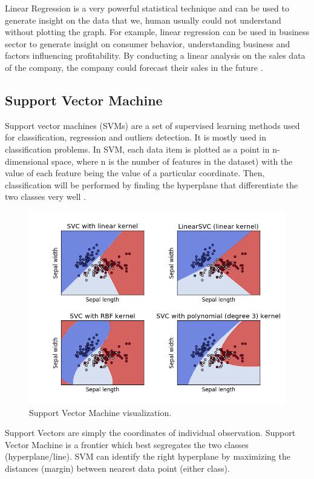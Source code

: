 \documentclass[journal]{IEEEtran}
\begin{document}
Linear Regression is a very powerful statistical technique and can be used to generate insight on the data that we, human usually could not understand without plotting the graph. For example, linear regression can be used in business sector to generate insight on consumer behavior, understanding business and factors influencing profitability. By conducting a linear analysis on the sales data of the company, the company could forecast their sales in the future \cite{Xu2016-hp}.

\subsection{Support Vector Machine}
Support vector machines (SVMs) are a set of supervised learning methods used for classification, regression and outliers detection. It is mostly used in classification problems. In SVM, each data item is plotted as a point in n-dimensional space, where n is the number of features in the dataset) with the value of each feature being the value of a particular coordinate. Then, classification will be performed by finding the hyperplane that differentiate the two classes very well \cite{Ray2017-ty}.

\begin{figure}[!ht]
	\centering
	\includegraphics[scale=0.3]{svc}
	\caption{Support Vector Machine visualization.}
\end{figure}

Support Vectors are simply the coordinates of individual observation. Support Vector Machine is a frontier which best segregates the two classes (hyperplane/line).
SVM can identify the right hyperplane by maximizing the distances (margin) between nearest data point (either class).
\end{document}
